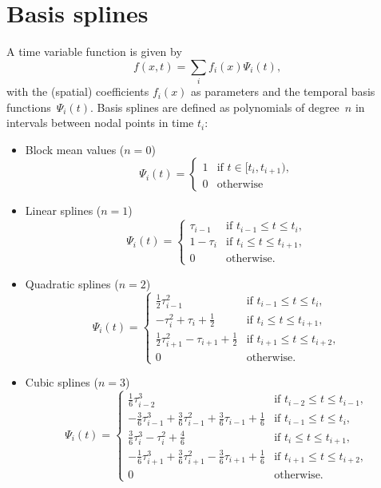 \section{Basis splines}\label{fundamentals.basisSplines}
A time variable function is given by
\begin{equation}
f(x,t) =  \sum_i f_i(x)\Psi_i(t),
\end{equation}
with the (spatial) coefficients $f_i(x)$ as parameters and the temporal basis functions~$\Psi_i(t)$.
Basis splines are defined as polynomials of degree~$n$ in intervals between nodal points in time $t_i$:
\begin{itemize}
\item Block mean values ($n=0$)
\begin{equation}
  \Psi_i(t) = \begin{cases}
  1 & \text{if } t\in[t_i,t_{i+1}), \\
  0 & \text{otherwise}
\end{cases}
\end{equation}
\item Linear splines ($n=1$)
\begin{equation}
  \Psi_i(t) = \begin{cases}
    \tau_{i-1}  & \text{if } t_{i-1} \le t \le t_i, \\
  1-\tau_i      & \text{if } t_{i}   \le t \le t_{i+1}, \\
  0 & \text{otherwise}.
\end{cases}
\end{equation}
\item Quadratic splines ($n=2$)
\begin{equation}
  \Psi_i(t) = \begin{cases}
  \frac{1}{2}\tau^2_{i-1}                           & \text{if } t_{i-1} \le t \le t_i, \\
            -\tau^2_{i}   +\tau_{i}   +\frac{1}{2}  & \text{if } t_{i}   \le t \le t_{i+1}, \\
  \frac{1}{2}\tau^2_{i+1} -\tau_{i+1} +\frac{1}{2}  & \text{if } t_{i+1} \le t \le t_{i+2}, \\
  0 & \text{otherwise}.
\end{cases}
\end{equation}
\item Cubic splines ($n=3$)
\begin{equation}
  \Psi_i(t) = \begin{cases}
   \frac{1}{6}\tau^3_{i-2}                                                               & \text{if } t_{i-2} \le t \le t_{i-1}, \\
  -\frac{3}{6}\tau^3_{i-1} +\frac{3}{6}\tau^2_{i-1} +\frac{3}{6}\tau_{i-1} +\frac{1}{6}  & \text{if } t_{i-1} \le t \le t_i,     \\
   \frac{3}{6}\tau^3_{i}   -           \tau^2_{i}   +\frac{4}{6}                         & \text{if } t_{i}   \le t \le t_{i+1}, \\
  -\frac{1}{6}\tau^3_{i+1} +\frac{3}{6}\tau^2_{i+1} -\frac{3}{6}\tau_{i+1} +\frac{1}{6}  & \text{if } t_{i+1} \le t \le t_{i+2}, \\
  0 & \text{otherwise}.
\end{cases}
\end{equation}
\end{itemize}

